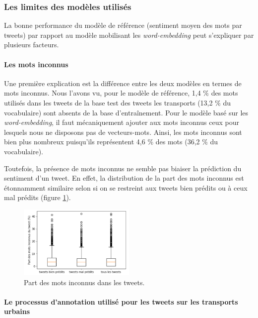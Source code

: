 \documentclass[11pt,french,french]{article}
\begin{document}
\subsubsection{Les limites des modèles
utilisés}\label{les-limites-des-moduxe8les-utilisuxe9s}

La bonne performance du modèle de référence (sentiment moyen des mots
par tweets) par rapport au modèle mobilisant les \emph{word-embedding}
peut s'expliquer par plusieurs facteurs.

\paragraph{Les mots inconnus}\label{les-mots-inconnus}

Une première explication est la différence entre les deux modèles en
termes de mots inconnus. Nous l'avons vu, pour le modèle de référence,
1,4 \% des mots utilisés dans les tweets de la base test des tweets les
transports (13,2 \% du vocabulaire) sont absents de la base
d'entraînement. Pour le modèle basé sur les \emph{word-embedding}, il
faut mécaniquement ajouter aux mots inconnus ceux pour lesquels nous ne
disposons pas de vecteurs-mots. Ainsi, les mots inconnus sont bien plus
nombreux puisqu'ils représentent 4,6 \% des mots (36,2 \% du
vocabulaire).

Toutefois, la présence de mots inconnus ne semble pas biaiser la
prédiction du sentiment d'un tweet. En effet, la distribution de la part
des mots inconnus est étonnamment similaire selon si on se restreint aux
tweets bien prédits ou à ceux mal prédits (figure
\ref{fig:mots_inconnus}).

\begin{figure}[ht]
\begin{center}
\includegraphics[width=0.5\textwidth]{img/mots_inconnus.png}
\captionsetup{margin=0cm,format=hang,justification=justified}
\caption{Part des mots inconnus dans les tweets.}\label{fig:mots_inconnus}
\end{center}
\end{figure}

\paragraph{Le processus d'annotation utilisé pour les tweets sur les
transports
urbains}\label{le-processus-dannotation-utilisuxe9-pour-les-tweets-sur-les-transports-urbains}
\end{document}
